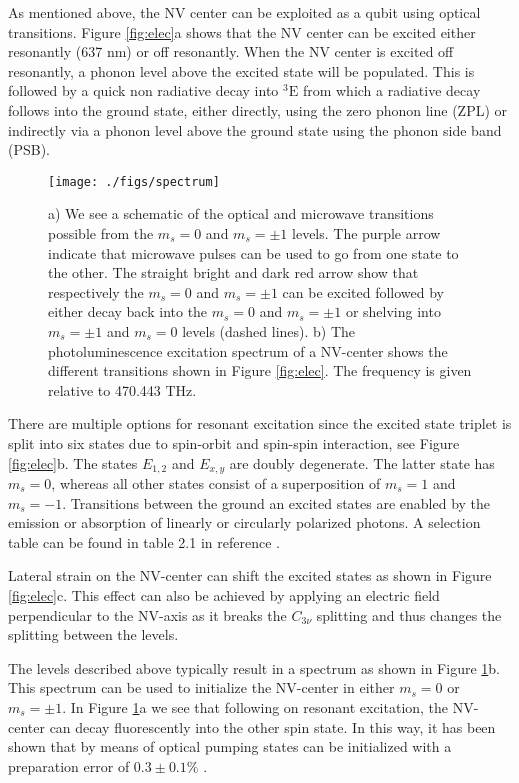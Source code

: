 As mentioned above, the NV center can be exploited  as a qubit using optical transitions. Figure \ref{fig:elec}a shows that the NV center can be excited either resonantly (637 nm) or off resonantly. When the NV center is excited off resonantly, a phonon level above the excited state will be populated. This is followed by a quick non radiative decay into $\mathrm{^3E}$ from which a radiative decay follows into the ground state, either directly, using the zero phonon line (ZPL) or indirectly via a phonon level above the ground state using the phonon side band (PSB).  

\begin{figure}[h!]\centering 
\texttt{[image: ./figs/spectrum]}
\caption{a) We see a schematic of the optical and microwave transitions possible from the $m_s = 0$ and $m_s = \pm 1$ levels. The purple arrow indicate that microwave pulses can be used to go from one state to the other. The straight bright and dark red arrow show that respectively the $m_s = 0$ and $m_s = \pm 1$ can be excited followed by either decay back into the $m_s = 0$ and $m_s = \pm 1$   or shelving into $m_s = \pm 1$ and $m_s = 0$ levels (dashed lines). b) The photoluminescence excitation spectrum of a NV-center shows the different transitions shown in Figure \ref{fig:elec}. The frequency is given relative to 470.443 THz.   }
\label{fig:spectrum}
\end{figure}

There are multiple options for resonant excitation since the excited state triplet is split into six states due to spin-orbit and spin-spin interaction, see Figure \ref{fig:elec}b. The states $E_{1,2}$ and $E_{x,y}$ are doubly degenerate. The latter state has $m_s \mathrm{= 0}$, whereas all other states consist of a superposition of $m_s \mathrm{= 1}$ and $m_s \mathrm{= -1}$. Transitions between the ground an excited states are enabled by the emission or absorption of linearly or circularly polarized photons. A selection table can be found in table 2.1 in reference \cite{Bernien2014thesis}.

Lateral strain on the NV-center can shift the excited states as shown in Figure \ref{fig:elec}c. This effect can also be achieved by applying an electric field perpendicular to the NV-axis as it breaks the $C_{3\nu}$ splitting and thus changes the splitting between the levels.  

The levels described above typically result in a spectrum as shown in Figure \ref{fig:spectrum}b. This spectrum can be used to initialize the NV-center in either $m_s \mathrm{= 0}$ or $m_s \mathrm{= \pm 1}$. In Figure \ref{fig:spectrum}a we see that following on resonant excitation, the NV-center can decay fluorescently into the other spin state. In this way, it has been shown that by means of optical pumping states can be initialized with a preparation error of $\mathrm{0.3 \pm 0.1 \%}$ \cite{robledo2011high}.


